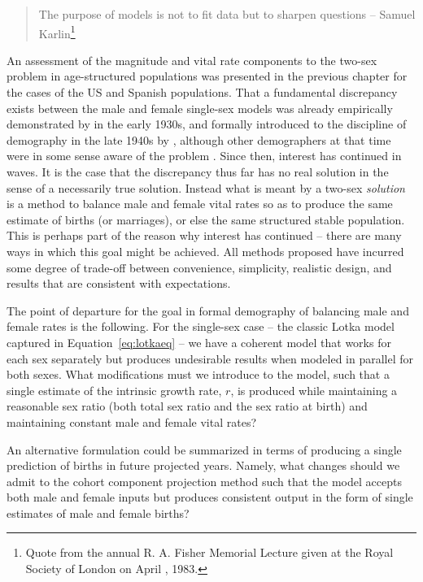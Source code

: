 \FloatBarrier
\label{sec:modelingapproaches}
\begin{singlespace}
\begin{quote}
The purpose of models is not to fit data but to sharpen questions -- Samuel
Karlin\footnote{Quote from the  annual R. A. Fisher Memorial Lecture
given at the Royal Society of London on April , 1983.}
\end{quote}
\end{singlespace}

An assessment of the magnitude and vital rate components to the two-sex
problem in age-structured populations was presented in the previous
chapter for the cases of the US and Spanish populations. That a fundamental
discrepancy exists between the male and female single-sex models was already
empirically demonstrated by \citet{kuczynski1932fertility} in the early 1930s, 
and formally introduced to the discipline of demography in the late 1940s by
\citet{karmel1947relations, karmel1948measurement}, although other demographers
at that time were in some sense aware of the problem \citep{quensel1941naagra,vincent1946mesure}. 
Since then, interest has continued in waves. It is the case that the discrepancy 
thus far has no real solution in the sense of a necessarily true solution. 
Instead what is meant by a two-sex \textit{solution} is a method to balance 
male and female vital rates so as to produce the same estimate of births (or marriages), 
or else the same structured stable population. This is
perhaps part of the reason why interest has continued -- there are many ways in
which this goal might be achieved. All methods proposed have incurred some degree of trade-off
between convenience, simplicity, realistic design, and results that are
consistent with expectations.
 
The point of departure for the goal in formal demography of balancing male and
female rates is the following. For the single-sex case -- the classic Lotka
model captured in Equation~\eqref{eq:lotkaeq} -- we have a coherent model that
works for each sex separately but produces undesirable results when modeled in parallel for both
sexes. What modifications must we introduce to the model, such that a single
estimate of the intrinsic growth rate, $r$, is produced while maintaining a
reasonable sex ratio (both total sex ratio and the sex ratio at birth) and
maintaining constant male and female vital rates? 

An alternative formulation
could be summarized in terms of producing a single prediction of births in
future projected years. Namely, what changes should we admit to the cohort
component projection method such that the model accepts both male and
female inputs but produces consistent output in the form of single estimates of
male and female births?

